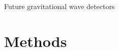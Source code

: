 \documentclass[usenames,dvipsnames,t]{beamer}
\begin{document}
\begin{frame}{Future gravitational wave detectors}





\end{frame}


  


\section{Methods}



    

    
\end{document}
